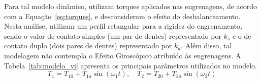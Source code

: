 Para tal modelo dinâmico,  utilizam torques aplicados nas engrenagens, de acordo com a Equação~\ref{eq:torques}, e desconsideram o efeito do desbalanceamento. Nesta análise,  utilizam um perfil retangular para a rigidez do engrenamento, sendo o valor de contato simples (um par de dentes) representado por $k_s$ e o de contato duplo (dois pares de dentes) representado por $k_d$. Além disso, tal modelagem não contempla o Efeito Giroscópico atribuído às engrenagens.
A Tabela~\ref{tab:modelo_yi} apresenta os principais parâmetros utilizados no modelo.
\begin{equation}
	T_1 = T_{10} + T_{1a} \sin (\omega_1 t), \quad T_2 = T_{20} + T_{2a} \sin(\omega_2 t)
	\label{eq:torques}
\end{equation}\begin{table}[H]
\centering
\begin{threeparttable}
	\caption{Principais parâmetros utilizados no modelo.}
	\label{tab:modelo_yi}
	
	\footnotesize %
	\renewcommand{\arraystretch}{1.2} %
	

\end{threeparttable}
\end{table}
